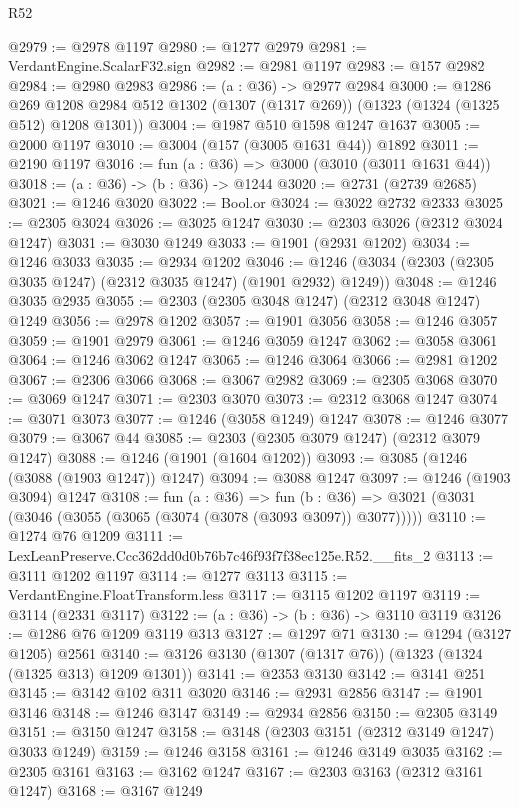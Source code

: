 \begin{lexlean}{R52}
\begin{coremodule}
@2979 := @2978 @1197
@2980 := @1277 @2979
@2981 := VerdantEngine.ScalarF32.sign
@2982 := @2981 @1197
@2983 := @157 @2982
@2984 := @2980 @2983
@2986 := (a : @36) -> @2977 @2984
@3000 := @1286
    @269
    @1208
    @2984
    @512
    @1302
    (@1307 (@1317 @269))
    (@1323 (@1324 (@1325 @512) @1208 @1301))
@3004 := @1987 @510 @1598 @1247 @1637
@3005 := @2000 @1197
@3010 := @3004 (@157 (@3005 @1631 @44)) @1892
@3011 := @2190 @1197
@3016 := fun (a : @36) => @3000 (@3010 (@3011 @1631 @44))
@3018 := (a : @36) -> (b : @36) -> @1244
@3020 := @2731 (@2739 @2685)
@3021 := @1246 @3020
@3022 := Bool.or
@3024 := @3022 @2732 @2333
@3025 := @2305 @3024
@3026 := @3025 @1247
@3030 := @2303 @3026 (@2312 @3024 @1247)
@3031 := @3030 @1249
@3033 := @1901 (@2931 @1202)
@3034 := @1246 @3033
@3035 := @2934 @1202
@3046 := @1246 (@3034 (@2303 (@2305 @3035 @1247) (@2312 @3035 @1247) (@1901 @2932) @1249))
@3048 := @1246 @3035 @2935
@3055 := @2303 (@2305 @3048 @1247) (@2312 @3048 @1247) @1249
@3056 := @2978 @1202
@3057 := @1901 @3056
@3058 := @1246 @3057
@3059 := @1901 @2979
@3061 := @1246 @3059 @1247
@3062 := @3058 @3061
@3064 := @1246 @3062 @1247
@3065 := @1246 @3064
@3066 := @2981 @1202
@3067 := @2306 @3066
@3068 := @3067 @2982
@3069 := @2305 @3068
@3070 := @3069 @1247
@3071 := @2303 @3070
@3073 := @2312 @3068 @1247
@3074 := @3071 @3073
@3077 := @1246 (@3058 @1249) @1247
@3078 := @1246 @3077
@3079 := @3067 @44
@3085 := @2303 (@2305 @3079 @1247) (@2312 @3079 @1247)
@3088 := @1246 (@1901 (@1604 @1202))
@3093 := @3085 (@1246 (@3088 (@1903 @1247)) @1247)
@3094 := @3088 @1247
@3097 := @1246 (@1903 @3094) @1247
@3108 := fun (a : @36) =>
  fun (b : @36) => @3021 (@3031 (@3046 (@3055 (@3065 (@3074 (@3078 (@3093 @3097)) @3077)))))
@3110 := @1274 @76 @1209
@3111 := LexLeanPreserve.Ccc362dd0d0b76b7c46f93f7f38ec125e.R52.__fits_2
@3113 := @3111 @1202 @1197
@3114 := @1277 @3113
@3115 := VerdantEngine.FloatTransform.less
@3117 := @3115 @1202 @1197
@3119 := @3114 (@2331 @3117)
@3122 := (a : @36) -> (b : @36) -> @3110 @3119
@3126 := @1286 @76 @1209 @3119 @313
@3127 := @1297 @71
@3130 := @1294 (@3127 @1205) @2561
@3140 := @3126 @3130 (@1307 (@1317 @76)) (@1323 (@1324 (@1325 @313) @1209 @1301))
@3141 := @2353 @3130
@3142 := @3141 @251
@3145 := @3142 @102 @311 @3020
@3146 := @2931 @2856
@3147 := @1901 @3146
@3148 := @1246 @3147
@3149 := @2934 @2856
@3150 := @2305 @3149
@3151 := @3150 @1247
@3158 := @3148 (@2303 @3151 (@2312 @3149 @1247) @3033 @1249)
@3159 := @1246 @3158
@3161 := @1246 @3149 @3035
@3162 := @2305 @3161
@3163 := @3162 @1247
@3167 := @2303 @3163 (@2312 @3161 @1247)
@3168 := @3167 @1249

\end{coremodule}
\end{lexlean}
